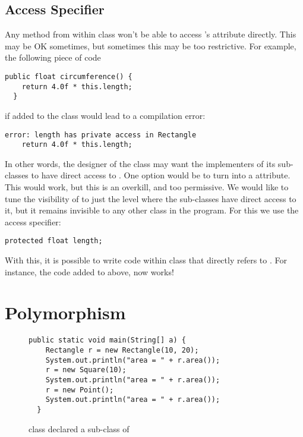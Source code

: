 \documentclass[12pt,a4paper]{article}
\begin{document}
\subsection{Access Specifier \lstinline@protected@}
Any method from within \lstinline@Square@ class won't be able to access \lstinline@Rectangle@'s \lstinline@length@ attribute directly. This may be OK sometimes, but sometimes this may be too restrictive. For example, the following piece of code
\begin{lstlisting}[frame=single]
  public float circumference() {
    return 4.0f * this.length;
  }
\end{lstlisting}
if added to the \lstinline@Square@ class would lead to a compilation error:
\begin{lstlisting}[frame=single]
 error: length has private access in Rectangle
    return 4.0f * this.length;
\end{lstlisting}


In other words, the designer of the \lstinline@Rectangle@ class may want the implementers of its sub-classes to have direct access to \lstinline@length@. One option would be to turn \lstinline@length@ into a \lstinline@public@ attribute. This would work, but this is an overkill, and too permissive. We would like to tune the visibility of \lstinline@length@ to just the level where the sub-classes have direct access to it, but it remains invisible to any other class in the program. For this we use the \lstinline@protected@ access specifier:
\begin{lstlisting}[frame=single]
  protected float length;
\end{lstlisting}

With this, it is possible to write code within \lstinline@Square@ class that directly refers to \lstinline@length@. For instance, the code added to \lstinline@Square@ above, now works!

\section{Polymorphism}

\begin{figure}[H]
\begin{lstlisting}[frame=single]
  public static void main(String[] a) {
    Rectangle r = new Rectangle(10, 20);
    System.out.println("area = " + r.area());
    r = new Square(10);
    System.out.println("area = " + r.area());
    r = new Point();
    System.out.println("area = " + r.area());
  }
\end{lstlisting}
\caption{\lstinline@Square@ class declared a sub-class of \lstinline@Rectangle@}
\label{f:poly}
\end{figure}
\end{document}
